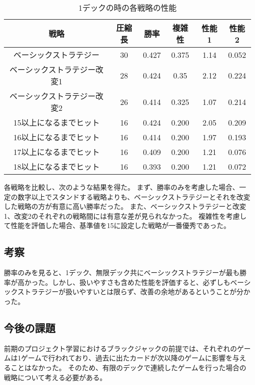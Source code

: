 \begin{table}[H]
\caption{1デックの時の各戦略の性能}
\label{table:data_type}
\begin{center}
\begin{tabular}{|c|c|c|c|c|c|}
\hline
戦略           & 圧縮長 & 勝率    & 複雑性   & 性能1  & 性能2   \\ \hline
ベーシックストラテジー         & 30  & 0.427 & 0.375 & 1.14 & 0.052 \\ \hline
ベーシックストラテジー改変1      & 28  & 0.424 & 0.35  & 2.12 & 0.224 \\ \hline
ベーシックストラテジー改変2      & 26  & 0.414 & 0.325 & 1.07 & 0.214 \\ \hline
15以上になるまでヒット & 16  & 0.424 & 0.200 & 2.05 & 0.209 \\ \hline
16以上になるまでヒット & 16  & 0.414 & 0.200 & 1.97 & 0.193 \\ \hline
17以上になるまでヒット & 16  & 0.409 & 0.200 & 1.21 & 0.076 \\ \hline
18以上になるまでヒット & 16  & 0.393 & 0.200 & 1.21 & 0.072 \\ \hline
\end{tabular}
\end{center}
\end{table}

各戦略を比較し、次のような結果を得た。
まず、勝率のみを考慮した場合、一定の数字以上でスタンドする戦略よりも、ベーシックストラテジーとそれを改変した戦略の方が有意に高い勝率だった。
また、ベーシックストラテジーと改変1、改変2のそれぞれの戦略間には有意な差が見られなかった。
複雑性を考慮して性能を評価した場合、基準値を15に設定した戦略が一番優秀であった。


\subsection{考察}

勝率のみを見ると、1デック、無限デック共にベーシックストラテジーが最も勝率が高かった。しかし、扱いやすさも含めた性能を評価すると、必ずしもベーシックストラテジーが扱いやすいとは限らず、改善の余地があるということが分かった。


\subsection{今後の課題}

前期のプロジェクト学習におけるブラックジャックの前提では、それぞれのゲームは1ゲームで行われており、過去に出たカードが次以降のゲームに影響を与えることはなかった。
そのため、有限のデックで連続したゲームを行った場合の戦略について考える必要がある。


